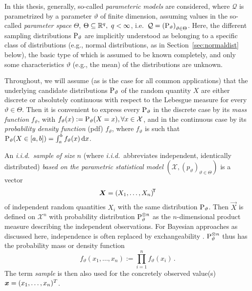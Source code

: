 In this thesis, generally, so-called \emph{parameteric models} are considered,
where $\mathcal{Q}$ is pa\-ra\-me\-trized by a parameter $\vartheta$ of finite dimension,
assuming values in the so-called \emph{parameter space} $\Theta$, $\Theta \subseteq \mathbb{R}^q, \ q < \infty$,
i.e.\ ${\cal Q}=\left(\operatorname{P}_\vartheta\right)_{\vartheta \in \Theta}$.
Here, the different sampling distributions $\operatorname{P}_\vartheta$ are implicitly understood as belonging to a specific class of distributions
(e.g., normal distributions, as in Section~\ref{sec:normaldist} below),
the basic type of which is assumed to be known completely,
and only some characteristics $\vartheta$ (e.g., the mean) of the distributions are unknown.

Throughout, we will assume (as is the case for all common applications)
that the underlying candidate distributions $\operatorname{P}_\vartheta$ of the random quantity $X$
are either discrete or absolutely continuous with respect to the Lebesgue measure
\parencite[see, e.g., ][pp.~32f, 38 for some technical details]{1993:karr} for every $\vartheta \in \Theta$.
Then it is convenient to express every $\operatorname{P}_\vartheta$ in the discrete case by its \emph{mass function} $f_\vartheta$,
with $f_\vartheta(x):=\operatorname{P}_\vartheta(X=x),\forall x \in \mathcal{X}$,
and in the continuous case by its \emph{probability density function} (pdf) $f_\vartheta$,
where $f_\vartheta$ is such that $\operatorname{P}_\vartheta(X \in [a,b]) = \int_a^b f_\vartheta(x) \,\mathrm{d} x$.

An \emph{i.i.d.\ sample of size} $n$ (where \emph{i.i.d.}\ abbreviates independent, identically distributed)
\emph{based on the parametric statistical model} %
$(\mathcal{X}, (p_\vartheta)_{\vartheta \in \Theta})$ is a vector
\[
\vec{X} = (X_1, \ldots, X_n)^\tra %
\]
of independent random quantities $X_i$ with the same distribution $\operatorname{P}_\vartheta$.
Then $\vec{X}$ is defined on $\mathcal{X}^n$ with probability distribution $\operatorname{P}_\vartheta^{\otimes n}$
as the $n$-dimensional product measure describing the independent observations.
For Bayesian approaches as discussed here,
independence is often replaced by exchangeability \parencite[see, e.g.,][\S 4.2]{2000:bernardosmith}.
$\operatorname{P}_\vartheta^{\otimes n}$ thus has the probability mass or density function
\[
f_\vartheta(x_1, \ldots, x_n) := \prod_{i=1}^{n} f_\vartheta(x_i)\,.%
\]
The term \emph{sample} is then also used for the concretely observed value(s) ${\bm x}=(x_1, \ldots, x_n)^T$.%

